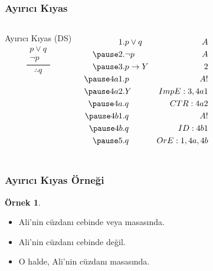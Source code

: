 \documentclass[dvipsnames]{beamer}
\theoremstyle{definition}
\theoremstyle{example}
\newtheorem{ornek}[theorem]{Örnek}
\theoremstyle{plain}
\begin{document}
\begin{frame}
  \frametitle{Ayırıcı Kıyas}

  \begin{columns}
    \begin{block}{Ayırıcı Kıyas (DS)}
      \[
      \frac
        {
          \begin{array}{c}
            p \vee q\\
            \neg p
          \end{array}
        }
        {
          \therefore q
        }
      \]
    \end{block}

    \pause
    \begin{eqnarray*}
      1.   & p \vee q        & A\\
      \pause
      2.   & \neg p          & A\\
      \pause
      3.   & p \rightarrow Y & 2\\
      \pause
      4a1. & p               & A!\\
      \pause
      4a2. & Y               & ImpE:3,4a1\\
      \pause
      4a.  & q               & CTR:4a2\\
      \pause
      4b1. & q               & A!\\
      \pause
      4b.  & q               & ID:4b1\\
      \pause
      5.   & q               & OrE:1,4a,4b
    \end{eqnarray*}
  \end{columns}
\end{frame}

\begin{frame}
  \frametitle{Ayırıcı Kıyas Örneği}

  \begin{ornek}
    \begin{itemize}
      \item Ali'nin cüzdanı cebinde veya masasında.
      \item Ali'nin cüzdanı cebinde değil.

      \pause
      \medskip
      \item O halde, Ali'nin cüzdanı masasında.
    \end{itemize}
  \end{ornek}
\end{frame}
\end{document}

